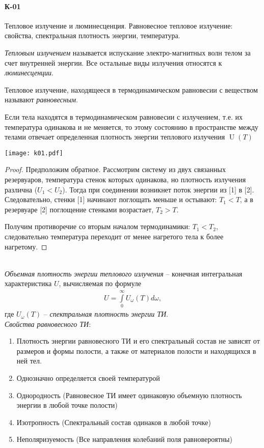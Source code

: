 \documentclass[__main__.tex]{subfiles}
\begin{document}
\paragraph{К-01}
Тепловое излучение и люминесценция. Равновесное тепловое излучение: свойства, спектральная плотность энергии, температура.\


\textit{Тепловым излучением} называется испускание электро-магнитных волн телом за счет внутренней энергии. Все остальные виды излучения относятся к \textit{люминесценции}.

Тепловое излучение, находящееся в термодинамическом равновесии с веществом называют \textit{равновесным}.

\begin{statement}
	Если тела находятся в термодинамическом равновесии с излучением, т.е. их температура одинакова и не меняется, то этому состоянию в пространстве между телами отвечает определенная плотность энергии теплового излучения $\operatorname{U}(T)$
\end{statement}
\begin{minipage}{.35\linewidth}
	\texttt{[image: k01.pdf]}
\end{minipage}
\hfill
\begin{minipage}{.6\linewidth}
	\begin{proof}
		Предположим обратное. Рассмотрим систему из двух связанных резервуаров, температура стенок которых одинакова, но плотность излучения различна ($U_1<U_2$). Тогда при соединении возникнет поток энергии из [1] в [2]. Следовательно, стенки [1] начинают поглощать меньше и остывают: $T_1 < T$, а в резервуаре [2] поглощение стенками возрастает, $T_2 > T$.
		
		Получим противоречие со вторым началом термодинамики: $T_1<T_2$, следовательно температура переходит от менее нагретого тела к более нагретому.
	\end{proof}
\end{minipage}\\

\textit{Объемная плотность энергии теплового излучения} -- конечная интегральная характеристика $U$, вычисляемая по формуле
\begin{gather*}
	U=\int\limits_{0}^{\infty}U_\omega(T)d\omega,
\end{gather*}
где $U_\omega(T)$ -- \textit{спектральная плотность энергии ТИ}.\\

\textit{Свойства равновесного ТИ}:
\begin{enumerate}
	\item
	Плотность энергии равновесного ТИ и его спектральный состав не зависят от размеров и формы полости, а также от материалов полости и находящихся в ней тел.
	\item
	Однозначно определяется своей температурой
	\item
	Однородность (Равновесное ТИ имеет одинаковую объемную плотность энергии в любой точке полости)
	\item
	Изотропность (Спектральный состав одинаков в любой точке)
	\item
	Неполяризуемость (Все направления колебаний поля равновероятны)
\end{enumerate}
\end{document}
